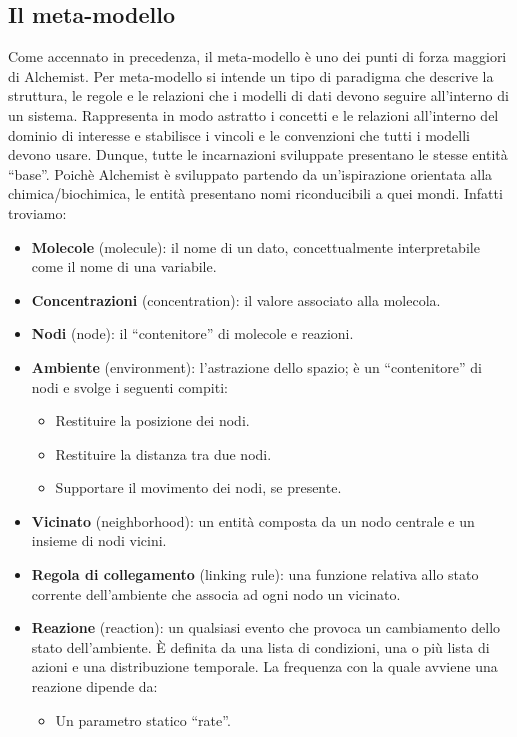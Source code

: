 \documentclass[12pt,a4paper,openright,twoside]{book}
\begin{document}
\subsection{Il meta-modello}
Come accennato in precedenza, il meta-modello è uno dei punti di forza maggiori di Alchemist. 
Per meta-modello si intende un tipo di paradigma che descrive la struttura, le regole e le relazioni
che i modelli di dati devono seguire all'interno di un sistema. Rappresenta in modo astratto i 
concetti e le relazioni all'interno del dominio di interesse e stabilisce i vincoli e le convenzioni
che tutti i modelli devono usare. Dunque, tutte le incarnazioni sviluppate presentano le stesse entità
``base''. Poichè Alchemist è sviluppato partendo da un'ispirazione orientata alla chimica/biochimica,
le entità presentano nomi riconducibili a quei mondi. Infatti troviamo:
\begin{itemize}
    \item \textbf{Molecole} (molecule): il nome di un dato, concettualmente interpretabile come il nome di una variabile.
    \item \textbf{Concentrazioni} (concentration): il valore associato alla molecola.
    \item \textbf{Nodi} (node): il “contenitore” di molecole e reazioni.
    \item \textbf{Ambiente} (environment): l'astrazione dello spazio; è un “contenitore” di nodi e svolge i seguenti compiti:
    \begin{itemize}
        \item Restituire la posizione dei nodi.
        \item Restituire la distanza tra due nodi.
        \item Supportare il movimento dei nodi, se presente.
    \end{itemize}
    \item \textbf{Vicinato} (neighborhood): un entità composta da un nodo centrale e un insieme di nodi vicini.
    \item \textbf{Regola di collegamento} (linking rule): una funzione relativa allo stato corrente dell'ambiente che associa ad ogni nodo un vicinato.
    \item \textbf{Reazione} (reaction): un qualsiasi evento che provoca un cambiamento dello stato dell'ambiente. È definita da una lista di condizioni, una o più lista di azioni e una distribuzione temporale. La frequenza con la quale avviene una reazione dipende da:
    \begin{itemize}
        \item Un parametro statico “rate”.

\end{itemize}
\end{itemize}
\end{document}
